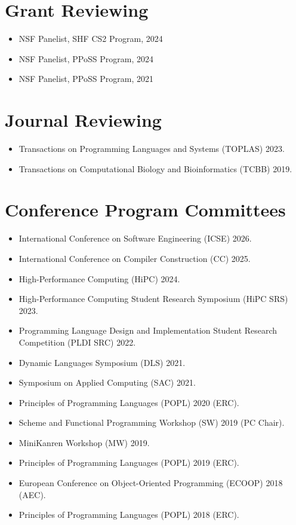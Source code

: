 \documentclass[line]{res}
\begin{document}
\begin{resume}
\section{\large Grant Reviewing} \vspace{0.45cm}
\begin{itemize}
  \item NSF Panelist, SHF CS2 Program, 2024
  \item NSF Panelist, PPoSS Program, 2024
  \item NSF Panelist, PPoSS Program, 2021
\end{itemize}

\section{\large Journal Reviewing} \vspace{0.45cm}
\begin{itemize}
  \item Transactions on Programming Languages and Systems (TOPLAS) 2023.
  \item Transactions on Computational Biology and Bioinformatics (TCBB) 2019. 
\end{itemize}

\section{\large Conference Program Committees} \vspace{0.45cm}
\begin{itemize}
  \item International Conference on Software Engineering (ICSE) 2026.
  \item International Conference on Compiler Construction (CC) 2025.
  \item High-Performance Computing (HiPC) 2024.
  \item High-Performance Computing Student Research Symposium (HiPC SRS) 2023.
  \item Programming Language Design and Implementation Student Research Competition (PLDI SRC) 2022.
  \item Dynamic Languages Symposium (DLS) 2021.
  \item Symposium on Applied Computing (SAC) 2021.
  \item Principles of Programming Languages (POPL) 2020 (ERC).
  \item Scheme and Functional Programming Workshop (SW) 2019 (PC Chair).
  \item MiniKanren Workshop (MW) 2019.
  \item Principles of Programming Languages (POPL) 2019 (ERC).
  \item European Conference on Object-Oriented Programming (ECOOP) 2018 (AEC).
  \item Principles of Programming Languages (POPL) 2018 (ERC).
\end{itemize}


\end{resume}
\end{document}
